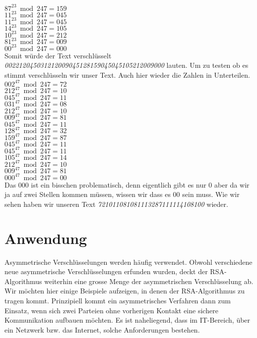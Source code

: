 $ 87^{23} \bmod 247 = 159 $ \\
$ 11^{23} \bmod 247 = 045 $ \\
$ 11^{23} \bmod 247 = 045 $ \\
$ 14^{23} \bmod 247 = 105 $ \\
$ 10^{23} \bmod 247 = 212 $ \\
$ 81^{23} \bmod 247 = 009 $ \\
$ 00^{23} \bmod 247 = 000 $ \\
Somit würde der Text verschlüsselt \textit{002212045031212009045128159045045105212009000} lauten.
Um zu testen ob es stimmt verschlüsseln wir unser Text. Auch hier wieder die Zahlen in Unterteilen.
$ 002^{47} \bmod 247 = 72 $ \\
$ 212^{47} \bmod 247 = 10 $ \\
$ 045^{47} \bmod 247 = 11 $ \\
$ 031^{47} \bmod 247 = 08 $ \\
$ 212^{47} \bmod 247 = 10 $ \\
$ 009^{47} \bmod 247 = 81 $ \\
$ 045^{47} \bmod 247 = 11 $ \\
$ 128^{47} \bmod 247 = 32 $ \\
$ 159^{47} \bmod 247 = 87 $ \\
$ 045^{47} \bmod 247 = 11 $ \\
$ 045^{47} \bmod 247 = 11 $ \\
$ 105^{47} \bmod 247 = 14 $ \\
$ 212^{47} \bmod 247 = 10 $ \\
$ 009^{47} \bmod 247 = 81 $ \\
$ 000^{47} \bmod 247 = 00 $ \\
Das 000 ist ein bisschen problematisch, denn eigentlich gibt es nur 0 aber da wir ja auf zwei Stellen kommen müssen, wissen wir dass es 00 sein muss. Wie wir sehen haben wir unseren Text \textit{721011081081113287111114108100}  wieder.


\section{Anwendung}
Asymmetrische Verschlüsselungen werden häufig verwendet.  Obwohl verschiedene neue asymmetrische Verschlüsselungen erfunden wurden, deckt der RSA-Algorithmus weiterhin eine grosse Menge der asymmetrischen Verschlüsselung ab.\\
Wir möchten hier einige Beispiele aufzeigen, in denen der RSA-Algorithmus zu tragen kommt. Prinzipiell kommt ein asymmetrisches Verfahren dann zum Einsatz, wenn sich zwei Parteien ohne vorherigen Kontakt eine sichere Kommunikation aufbauen möchten. Es ist naheliegend, dass im IT-Bereich, über ein Netzwerk bzw. das Internet, solche Anforderungen bestehen.

